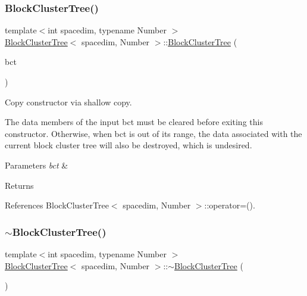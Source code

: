 \subsubsection{\texorpdfstring{Block\+Cluster\+Tree()}{BlockClusterTree()}\hspace{0.1cm}{\footnotesize\ttfamily [8/8]}}
{\footnotesize\ttfamily template$<$int spacedim, typename Number $>$ \\
\hyperlink{classBlockClusterTree}{Block\+Cluster\+Tree}$<$ spacedim, Number $>$\+::\hyperlink{classBlockClusterTree}{Block\+Cluster\+Tree} (\begin{DoxyParamCaption}\item[{\hyperlink{classBlockClusterTree}{Block\+Cluster\+Tree}$<$ spacedim, Number $>$ \&\&}]{bct }\end{DoxyParamCaption})}

Copy constructor via shallow copy.


\begin{DoxyDescription}
\item[Note ]The data members of the input {\ttfamily bct} must be cleared before exiting this constructor. Otherwise, when {\ttfamily bct} is out of its range, the data associated with the current block cluster tree will also be destroyed, which is undesired. 
\end{DoxyDescription}


\begin{DoxyParams}{Parameters}
{\em bct} & \\
\hline
\end{DoxyParams}
\begin{DoxyReturn}{Returns}

\end{DoxyReturn}


References Block\+Cluster\+Tree$<$ spacedim, Number $>$\+::operator=().

\mbox{\label{classBlockClusterTree_a43b969867200b06f3416647c3e4f9f61}} 
\subsubsection{\texorpdfstring{$\sim$\+Block\+Cluster\+Tree()}{~BlockClusterTree()}}
{\footnotesize\ttfamily template$<$int spacedim, typename Number $>$ \\
\hyperlink{classBlockClusterTree}{Block\+Cluster\+Tree}$<$ spacedim, Number $>$\+::$\sim$\hyperlink{classBlockClusterTree}{Block\+Cluster\+Tree} (\begin{DoxyParamCaption}{ }\end{DoxyParamCaption})}

